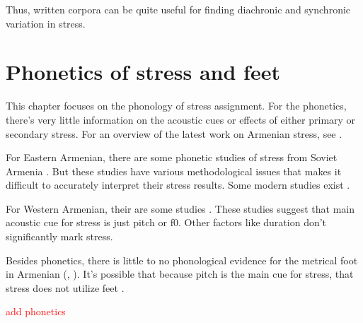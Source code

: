 Thus, written corpora can be quite useful for finding diachronic and synchronic variation in stress. 

\section{Phonetics of stress and feet}\label{section:stress:phoneticsFeet}
This chapter focuses on the phonology of stress assignment. For the phonetics, there's very little information on the acoustic cues or effects of either primary or secondary stress. For an overview of the latest work on Armenian stress, see \citet{Seyfarth-JIPAArmenian}. 


For Eastern Armenian, there are some phonetic studies of stress from Soviet Armenia \citep{Khachatryan-1988-ArmenianPhono,Tokhmakhyan-1983-ArmenianPhono}. But these studies have various methodological issues that makes it difficult to accurately interpret their stress results. Some modern studies exist   \citep{Haghverdi-2016-ArmenianSchwa}.  

For Western Armenian, their are some   studies \citep{gordon2012sonority,AthanasopoulouVogelMe-2017-AcousticPropertiesCanonicalNonCanonical}. These studies suggest that main acoustic cue for stress is just pitch or f0. Other factors like duration don't significantly mark stress. 





Besides phonetics, there is little to no phonological evidence for the metrical foot in Armenian  (\citealp[42ff]{DeLisi-2015-EpenthesisProtoArmenian}, \citeyear[115]{DeLisi-2018-ArmenianProsodyDiachrony}). It's possible that because pitch is the main cue for stress, that stress does not utilize feet  \citep{Ozccelik-2017-FootObligatoryConstTurkishFrench}.   

\textcolor{red}{add phonetics}


